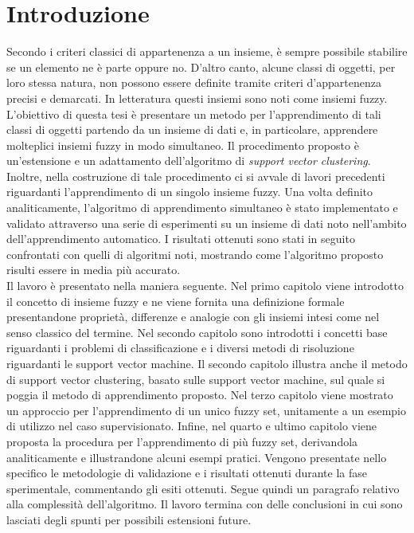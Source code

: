 \documentclass [11pt,a4paper,twoside,openright] {book}
\begin{document}
\chapter*{Introduzione}
Secondo i criteri classici di appartenenza a un insieme, è sempre possibile stabilire se un elemento ne è parte oppure no. D'altro canto, alcune classi di oggetti, per loro stessa natura, non possono essere definite tramite criteri d'appartenenza precisi e demarcati. In letteratura questi insiemi sono noti come insiemi fuzzy. L'obiettivo di questa tesi è presentare un metodo per l'apprendimento di tali classi di oggetti partendo da un insieme di dati e, in particolare, apprendere molteplici insiemi fuzzy in modo simultaneo. Il procedimento proposto è un'estensione e un adattamento dell'algoritmo di \textit{support vector clustering}. Inoltre, nella costruzione di tale procedimento ci si avvale di lavori precedenti riguardanti l'apprendimento di un singolo insieme fuzzy. Una volta definito analiticamente, l'algoritmo di apprendimento simultaneo è stato implementato e validato attraverso una serie di esperimenti su un insieme di dati noto nell'ambito dell'apprendimento automatico. I risultati ottenuti sono stati in seguito confrontati con quelli di algoritmi noti, mostrando come l'algoritmo proposto risulti essere in media più accurato.\\
Il lavoro è presentato nella maniera seguente. Nel primo capitolo viene introdotto il concetto di insieme fuzzy e ne viene fornita una definizione formale presentandone proprietà, differenze e analogie con gli insiemi intesi come nel senso classico del termine. Nel secondo capitolo sono introdotti i concetti base riguardanti i problemi di classificazione e i diversi metodi di risoluzione riguardanti le support vector machine. Il secondo capitolo illustra anche il metodo di support vector clustering, basato sulle support vector machine, sul quale si poggia il metodo di apprendimento proposto. Nel terzo capitolo viene mostrato un approccio per l'apprendimento di un unico fuzzy set, unitamente a un esempio di utilizzo nel caso supervisionato. Infine, nel quarto e ultimo capitolo viene proposta la procedura per l'apprendimento di più fuzzy set, derivandola analiticamente e illustrandone alcuni esempi pratici. Vengono presentate nello specifico le metodologie di validazione e i risultati ottenuti durante la fase sperimentale, commentando gli esiti ottenuti. Segue quindi un paragrafo relativo alla complessità dell'algoritmo. Il lavoro termina con delle conclusioni in cui sono lasciati degli spunti per possibili estensioni future.
\end{document}
